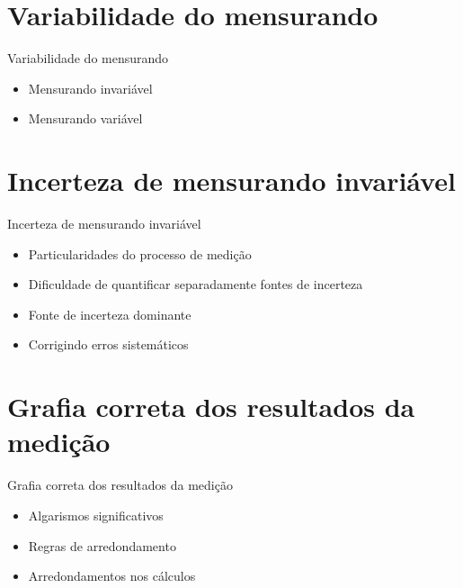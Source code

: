 \documentclass[aspectratio=169,xcolor=dvipsnames]{beamer}
\begin{document}
\section{Variabilidade do mensurando}

\begin{frame}{Variabilidade do mensurando}
    \begin{itemize}
   	 \item Mensurando invariável
   	 \item Mensurando variável
    \end{itemize}
\end{frame}

\section{Incerteza de mensurando invariável}

\begin{frame}{Incerteza de mensurando invariável}
    \begin{itemize}
   	 \item Particularidades do processo de medição
   	 \item Dificuldade de quantificar separadamente fontes de incerteza
   	 \item Fonte de incerteza dominante
   	 \item Corrigindo erros sistemáticos
    \end{itemize}
\end{frame}

\section{Grafia correta dos resultados da medição}

\begin{frame}{Grafia correta dos resultados da medição}
    \begin{itemize}
   	 \item Algarismos significativos
   	 \item Regras de arredondamento
   	 \item Arredondamentos nos cálculos
    \end{itemize}
\end{frame}
\end{document}
